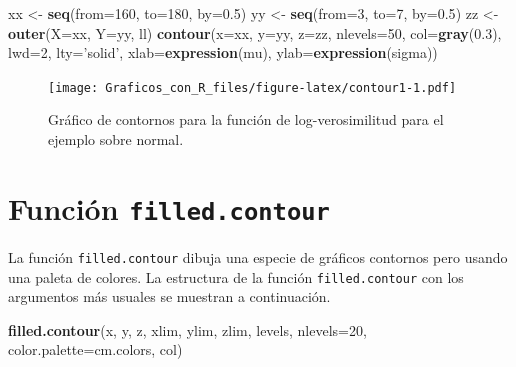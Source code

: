 \documentclass[10pt,]{krantz}
\makeatletter
\newenvironment{Shaded}{\begin{snugshade}}{\end{snugshade}}
\newcommand{\KeywordTok}[1]{\textcolor[rgb]{0.13,0.29,0.53}{\textbf{{#1}}}}
\newcommand{\DataTypeTok}[1]{\textcolor[rgb]{0.13,0.29,0.53}{{#1}}}
\newcommand{\DecValTok}[1]{\textcolor[rgb]{0.00,0.00,0.81}{{#1}}}
\newcommand{\FloatTok}[1]{\textcolor[rgb]{0.00,0.00,0.81}{{#1}}}
\newcommand{\StringTok}[1]{\textcolor[rgb]{0.31,0.60,0.02}{{#1}}}
\newcommand{\NormalTok}[1]{{#1}}
\newenvironment{kframe}{%
\medskip{}
\setlength{\fboxsep}{.8em}
 \def\at@end@of@kframe{}%
 \ifinner\ifhmode%
  \def\at@end@of@kframe{\end{minipage}}%
  \begin{minipage}{\columnwidth}%
 \fi\fi%
 \def\FrameCommand##1{\hskip\@totalleftmargin \hskip-\fboxsep
 \colorbox{shadecolor}{##1}\hskip-\fboxsep
     \hskip-\linewidth \hskip-\@totalleftmargin \hskip\columnwidth}%
 \MakeFramed {\advance\hsize-\width
   \@totalleftmargin\z@ \linewidth\hsize
   \@setminipage}}%
 {\par\unskip\endMakeFramed%
 \at@end@of@kframe}
\renewenvironment{Shaded}{\begin{kframe}}{\end{kframe}}
\makeatother
\begin{document}
\begin{Shaded}
\begin{Highlighting}[]
\NormalTok{xx <-}\StringTok{ }\KeywordTok{seq}\NormalTok{(}\DataTypeTok{from=}\DecValTok{160}\NormalTok{, }\DataTypeTok{to=}\DecValTok{180}\NormalTok{, }\DataTypeTok{by=}\FloatTok{0.5}\NormalTok{)}
\NormalTok{yy <-}\StringTok{ }\KeywordTok{seq}\NormalTok{(}\DataTypeTok{from=}\DecValTok{3}\NormalTok{, }\DataTypeTok{to=}\DecValTok{7}\NormalTok{, }\DataTypeTok{by=}\FloatTok{0.5}\NormalTok{)}
\NormalTok{zz <-}\StringTok{ }\KeywordTok{outer}\NormalTok{(}\DataTypeTok{X=}\NormalTok{xx, }\DataTypeTok{Y=}\NormalTok{yy, ll)}
\KeywordTok{contour}\NormalTok{(}\DataTypeTok{x=}\NormalTok{xx, }\DataTypeTok{y=}\NormalTok{yy, }\DataTypeTok{z=}\NormalTok{zz, }\DataTypeTok{nlevels=}\DecValTok{50}\NormalTok{,}
        \DataTypeTok{col=}\KeywordTok{gray}\NormalTok{(}\FloatTok{0.3}\NormalTok{), }\DataTypeTok{lwd=}\DecValTok{2}\NormalTok{, }\DataTypeTok{lty=}\StringTok{'solid'}\NormalTok{,}
        \DataTypeTok{xlab=}\KeywordTok{expression}\NormalTok{(mu), }\DataTypeTok{ylab=}\KeywordTok{expression}\NormalTok{(sigma))}
\end{Highlighting}
\end{Shaded}

\begin{figure}[htbp]
\centering
\texttt{[image: Graficos\_con\_R\_files/figure-latex/contour1-1.pdf]}
\caption{\label{fig:contour1}Gráfico de contornos para la función de
log-verosimilitud para el ejemplo sobre normal.}
\end{figure}

\section{\texorpdfstring{Función \texttt{filled.contour}
}{Función filled.contour  }}\label{funcion-filled.contour}

La función \texttt{filled.contour} dibuja una especie de gráficos
contornos pero usando una paleta de colores. La estructura de la función
\texttt{filled.contour} con los argumentos más usuales se muestran a
continuación.

\begin{Shaded}
\begin{Highlighting}[]
\KeywordTok{filled.contour}\NormalTok{(x, y, z,}
               \NormalTok{xlim, ylim, zlim,}
               \NormalTok{levels, }\DataTypeTok{nlevels=}\DecValTok{20}\NormalTok{,}
               \DataTypeTok{color.palette=}\NormalTok{cm.colors, col)}
\end{Highlighting}
\end{Shaded}
\end{document}
